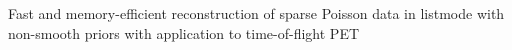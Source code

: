Fast and memory-efficient reconstruction of sparse Poisson data in listmode with non-smooth priors with application to time-of-flight PET
